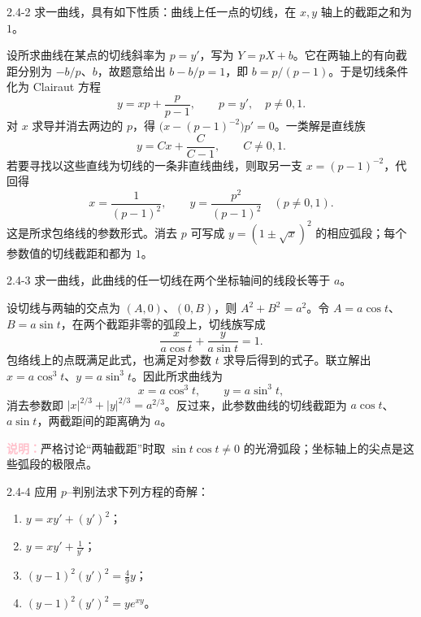 \documentclass[UTF8,a4paper,11pt]{ctexart}
\newcommand{\note}[1]{\par\smallskip\noindent\textcolor{pink}{\bfseries 说明：}#1\par\smallskip}
\begin{document}
\begin{problem}{2.4-2}
求一曲线，具有如下性质：曲线上任一点的切线，在 $x,y$ 轴上的截距之和为 $1$。
\end{problem}

\begin{solution}
设所求曲线在某点的切线斜率为 $p=y'$，写为 $Y=pX+b$。它在两轴上的有向截距分别为 $-b/p$、$b$，故题意给出 $b-b/p=1$，即 $b=p/(p-1)$。于是切线条件化为 Clairaut 方程
\[
y=xp+\frac{p}{p-1},\qquad p=y',\quad p\ne0,1.
\]
对 $x$ 求导并消去两边的 $p$，得 $\bigl(x-(p-1)^{-2}\bigr)p'=0$。一类解是直线族
\[
y=Cx+\frac{C}{C-1},\qquad C\ne0,1.
\]
若要寻找以这些直线为切线的一条非直线曲线，则取另一支 $x=(p-1)^{-2}$，代回得
\[
\boxed{x=\frac1{(p-1)^2},\qquad y=\frac{p^2}{(p-1)^2}\quad(p\ne0,1).}
\]
这是所求包络线的参数形式。消去 $p$ 可写成 $y=(1\pm\sqrt{x})^2$ 的相应弧段；每个参数值的切线截距和都为 $1$。
\end{solution}

\begin{problem}{2.4-3}
求一曲线，此曲线的任一切线在两个坐标轴间的线段长等于 $a$。
\end{problem}

\begin{solution}
设切线与两轴的交点为 $(A,0)$、$(0,B)$，则 $A^2+B^2=a^2$。令 $A=a\cos t$、$B=a\sin t$，在两个截距非零的弧段上，切线族写成
\[
\frac{x}{a\cos t}+\frac{y}{a\sin t}=1.
\]
包络线上的点既满足此式，也满足对参数 $t$ 求导后得到的式子。联立解出 $x=a\cos^3t$、$y=a\sin^3t$。因此所求曲线为
\[
\boxed{x=a\cos^3t,\qquad y=a\sin^3t,}
\]
消去参数即 $\boxed{|x|^{2/3}+|y|^{2/3}=a^{2/3}}$。反过来，此参数曲线的切线截距为 $a\cos t$、$a\sin t$，两截距间的距离确为 $a$。
\note{严格讨论“两轴截距”时取 $\sin t\cos t\ne0$ 的光滑弧段；坐标轴上的尖点是这些弧段的极限点。}
\end{solution}

\begin{problem}{2.4-4}
应用 $p$--判别法求下列方程的奇解：
  \begin{enumerate}[label=(\arabic*)]
    \item $y=xy'+(y')^2$；
    \item $\displaystyle y=xy'+\frac{1}{y'}$；
    \item $\displaystyle (y-1)^2(y')^2=\frac49y$；
    \item $\displaystyle (y-1)^2(y')^2=ye^{xy}$。
  \end{enumerate}
\end{problem}
\end{document}
